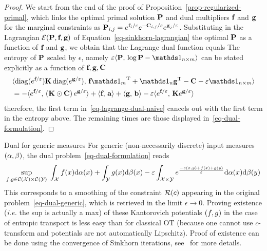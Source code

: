 \begin{proof}
We start from the end of the proof of Proposition~\ref{prop-regularized-primal}, which links the optimal primal solution $\P$ and dual multipliers $\fD$ and $\gD$ for the marginal constraints as $\P_{i,j}=e^{\fD_i/\varepsilon}e^{-\C_{i,j}/\varepsilon}e^{\gD_j/\varepsilon}$. Substituting in the Lagrangian $\Lag(\P,\fD,\gD)$ of Equation~\eqref{eq-sinkhorn-lagrangian} the optimal $\P$ as a function of $\fD$ and $\gD$, we obtain that the Lagrange dual function equals
The entropy of $\P$ scaled by $\epsilon$, namely $\epsilon \dotp{\P}{\log \P - \ones_{n\times m}}$ can be stated explicitly as a function of $\fD,\gD, \C$
\begin{align*}
&\dotp{\diag(e^{\fD/\epsilon}) \K \diag(e^{\gD/\epsilon})}{\fD\transp{\ones_m}+\ones_n\transp{\gD}-\C-\epsilon\ones_{n\times m}}\\
&= -\dotp{e^{\fD/\epsilon}}{\left(\K\odot \C\right)e^{\gD/\epsilon}} + \dotp{\fD}{\a}+ \dotp{\gD}{\b}-\epsilon \dotp{e^{\fD/\epsilon}}{\K e^{\gD/\epsilon}}
\end{align*}
therefore, the first term in~\eqref{eq-lagrange-dual-naive} cancels out with the first term in the entropy above. The remaining times are those displayed in~\eqref{eq-dual-formulation}.
\end{proof}


\begin{rem}{Dual for generic measures}
For generic (non-necessarily discrete) input measures $(\al,\be)$, the dual problem~\eqref{eq-dual-formulation} reads
\begin{align*}
	\usup{\f,\g \in \Cc(\X)\times\Cc(\Y)} \int_\X \f(x)\d\al(x) + \int_\Y \g(x)\d\be(x) 
		 - \epsilon \int_{\X\times\Y} e^{ \frac{-c(x,y)+f(x)+g(y)}{\epsilon} } \d\al(x)\d\be(y)
\end{align*}
This corresponds to a smoothing of the constraint $\Potentials(\c)$ appearing in the original problem~\eqref{eq-dual-generic}, which is retrieved in the limit $\epsilon \rightarrow 0$.
%
Proving existence (\emph{i.e.} the sup is actually a max) of these Kantorovich potentials $(\f,\g)$ in the case of entropic transport is less easy than for classical OT (because one cannot use $c$-transform and potentials are not automatically Lipschitz). Proof of existence can be done using the convergence of Sinkhorn iterations, see~\cite{2016-chizat-sinkhorn} for more details. 
\end{rem}


